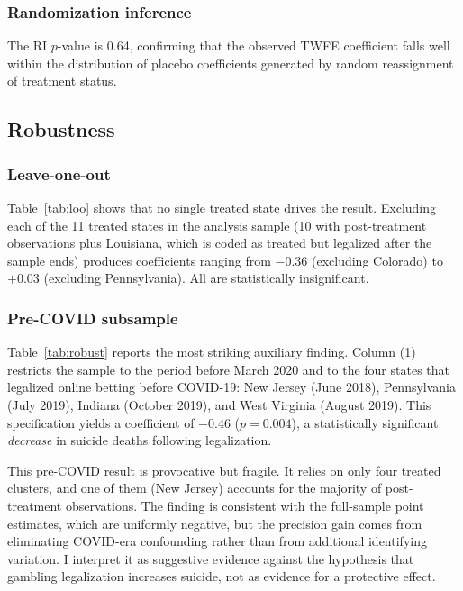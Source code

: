 \documentclass[12pt]{article}
\begin{document}
\subsubsection*{Randomization inference} The RI $p$-value is 0.64, confirming that the observed TWFE coefficient falls well within the distribution of placebo coefficients generated by random reassignment of treatment status.

\subsection{Robustness}

\subsubsection*{Leave-one-out} Table~\ref{tab:loo} shows that no single treated state drives the result. Excluding each of the 11 treated states in the analysis sample (10 with post-treatment observations plus Louisiana, which is coded as treated but legalized after the sample ends) produces coefficients ranging from $-0.36$ (excluding Colorado) to $+0.03$ (excluding Pennsylvania). All are statistically insignificant.



\subsubsection*{Pre-COVID subsample} Table~\ref{tab:robust} reports the most striking auxiliary finding. Column (1) restricts the sample to the period before March 2020 and to the four states that legalized online betting before COVID-19: New Jersey (June 2018), Pennsylvania (July 2019), Indiana (October 2019), and West Virginia (August 2019). This specification yields a coefficient of $-0.46$ ($p = 0.004$), a statistically significant \textit{decrease} in suicide deaths following legalization.



This pre-COVID result is provocative but fragile. It relies on only four treated clusters, and one of them (New Jersey) accounts for the majority of post-treatment observations. The finding is consistent with the full-sample point estimates, which are uniformly negative, but the precision gain comes from eliminating COVID-era confounding rather than from additional identifying variation. I interpret it as suggestive evidence against the hypothesis that gambling legalization increases suicide, not as evidence for a protective effect.
\end{document}
